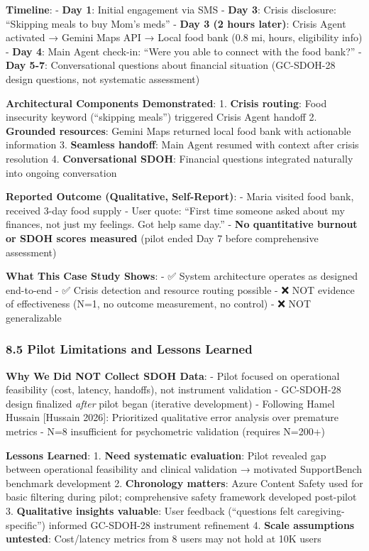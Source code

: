 \documentclass[
]{article}
\begin{document}
\textbf{Timeline}: - \textbf{Day 1}: Initial engagement via SMS -
\textbf{Day 3}: Crisis disclosure: ``Skipping meals to buy Mom's meds''
- \textbf{Day 3 (2 hours later)}: Crisis Agent activated → Gemini Maps
API → Local food bank (0.8 mi, hours, eligibility info) - \textbf{Day
4}: Main Agent check-in: ``Were you able to connect with the food
bank?'' - \textbf{Day 5-7}: Conversational questions about financial
situation (GC-SDOH-28 design questions, not systematic assessment)

\textbf{Architectural Components Demonstrated}: 1. \textbf{Crisis
routing}: Food insecurity keyword (``skipping meals'') triggered Crisis
Agent handoff 2. \textbf{Grounded resources}: Gemini Maps returned local
food bank with actionable information 3. \textbf{Seamless handoff}: Main
Agent resumed with context after crisis resolution 4.
\textbf{Conversational SDOH}: Financial questions integrated naturally
into ongoing conversation

\textbf{Reported Outcome (Qualitative, Self-Report)}: - Maria visited
food bank, received 3-day food supply - User quote: ``First time someone
asked about my finances, not just my feelings. Got help same day.'' -
\textbf{No quantitative burnout or SDOH scores measured} (pilot ended
Day 7 before comprehensive assessment)

\textbf{What This Case Study Shows}: - ✅ System architecture operates
as designed end-to-end - ✅ Crisis detection and resource routing
possible - ❌ NOT evidence of effectiveness (N=1, no outcome
measurement, no control) - ❌ NOT generalizable

\subsubsection{8.5 Pilot Limitations and Lessons
Learned}\label{pilot-limitations-and-lessons-learned}

\textbf{Why We Did NOT Collect SDOH Data}: - Pilot focused on
operational feasibility (cost, latency, handoffs), not instrument
validation - GC-SDOH-28 design finalized \emph{after} pilot began
(iterative development) - Following Hamel Hussain {[}Hussain 2026{]}:
Prioritized qualitative error analysis over premature metrics - N=8
insufficient for psychometric validation (requires N=200+)

\textbf{Lessons Learned}: 1. \textbf{Need systematic evaluation}: Pilot
revealed gap between operational feasibility and clinical validation →
motivated SupportBench benchmark development 2. \textbf{Chronology
matters}: Azure Content Safety used for basic filtering during pilot;
comprehensive safety framework developed post-pilot 3.
\textbf{Qualitative insights valuable}: User feedback (``questions felt
caregiving-specific'') informed GC-SDOH-28 instrument refinement 4.
\textbf{Scale assumptions untested}: Cost/latency metrics from 8 users
may not hold at 10K users
\end{document}

